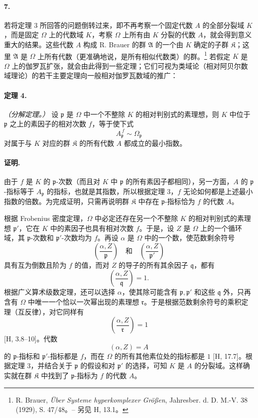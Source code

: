 
\paragraph{7.}
若将定理 3 所回答的问题倒转过来，即不再考察一个固定代数 \(A\) 的全部分裂域 \(K\)，而是固定 \(\Omega\) 上的代数域 \(K\)，考察 \(\Omega\) 上所有由 \(K\) 分裂的代数 \(A\)，就会得到意义重大的结果。这些代数 \(A\) 构成 R. Brauer 的群 \(\mathfrak A\) 的一个由 \(K\) 确定的子群 \(\mathfrak K\)；这里 \(\mathfrak A\) 是 \(\Omega\) 上所有代数（更准确地说，是所有相似代数类）的群。\footnote{R. Brauer, \emph{Über Systeme hyperkomplexer Größen}, Jahresber. d. D. M.-V. 38 (1929), S. 47/48。-- 另见 H, 13.1。} 若假定 \(K\) 是 \(\Omega\) 上的伽罗瓦扩张，就会由此得到一些定理；它们可视为类域论（相对阿贝尔数域理论）的若干主要定理向一般相对伽罗瓦数域的推广：

\paragraph{定理 4.}
\emph{（分解定理。）} 设 \(\mathfrak p\) 是 \(\Omega\) 中一个不整除 \(K\) 的相对判别式的素理想，则 \(K\) 中位于 \(\mathfrak p\) 之上的素因子的相对次数 \(f\)，等于使下式
\[
        A_{\mathfrak p}^{\,f}\sim\Omega_{\mathfrak p}
\]
对属于与 \(K\) 对应的群 \(\mathfrak K\) 的所有代数 \(A\) 都成立的最小指数。

\paragraph{证明.}
由于 \(f\) 是 \(K\) 的 \(\mathfrak p\)-次数（而且对 \(K\) 中 \(\mathfrak p\) 的所有素因子都相同），另一方面，\(A\) 的 \(\mathfrak p\)-指标等于 \(A_{\mathfrak p}\) 的指标，也就是其指数，所以根据定理 3，\(f\) 无论如何都是上述最小指数的倍数。为完成证明，只需再说明群 \(\mathfrak K\) 中存在 \(\mathfrak p\)-指标恰为 \(f\) 的代数 \(A\)。

根据 Frobenius 密度定理，\(\Omega\) 中必定还存在另一个不整除 \(K\) 的相对判别式的素理想 \(\mathfrak p'\)，它在 \(K\) 中的素因子也具有相对次数 \(f\)。于是，设 \(Z\) 是 \(\Omega\) 上的一个循环域，其 \(\mathfrak p\)-次数和 \(\mathfrak p'\)-次数均为 \(f\)。再设 \(\alpha\) 是 \(\Omega\) 中的一个数，使范数剩余符号
\[
\left(\frac{\alpha,Z}{\mathfrak p}\right)\quad\text{和}\quad
\left(\frac{\alpha,Z}{\mathfrak p'}\right)
\]
具有互为倒数且阶为 \(f\) 的值，而对 \(Z\) 的导子的所有其余因子 \(\mathfrak q\)，都有
\[
\left(\frac{\alpha,Z}{\mathfrak q}\right)=1.
\]
根据广义算术级数定理，还可以选择 \(\alpha\)，使其除可能含有 \(\mathfrak p,\mathfrak p'\) 和这些 \(\mathfrak q\) 外，只再含有 \(\Omega\) 中唯一一个恰以一次幂出现的素理想 \(\mathfrak r\)。于是根据范数剩余符号的乘积定理（互反律），对它同样有
\[
\left(\frac{\alpha,Z}{\mathfrak r}\right)=1
\]
[H, 3.8--10]。代数
\[
        (\alpha,Z)=A
\]
的 \(\mathfrak p\)-指标和 \(\mathfrak p'\)-指标都是 \(f\)，而在 \(\Omega\) 的所有其他素位处的指标都是 \(1\) [H, 17.7]。根据定理 3，并结合关于 \(\mathfrak p\) 的假设和对 \(\mathfrak p'\) 的选择，可知 \(K\) 是 \(A\) 的分裂域。这样确实就在群 \(\mathfrak K\) 中找到了 \(\mathfrak p\)-指标为 \(f\) 的代数 \(A\)。

